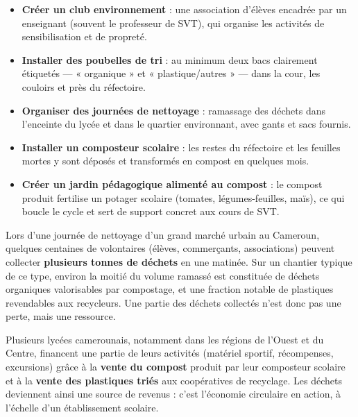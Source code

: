 \documentclass[11pt]{article}
\newcommand{\cle}[1]{{\popxbold\color{popdark}#1}}
\newcounter{popsec}
\newcounter{popsub}
\newcommand{\courssub}[1]{%
  \stepcounter{popsub}%
  \par\vspace{9pt}\noindent{\popxbold\fontsize{11.5}{13}\selectfont\color{popink}{\color{poporange}\thepopsec.\thepopsub}\hspace{6pt}#1}\par\nopagebreak\vspace{4pt}
}
\begin{document}
\begin{itemize}
\item \textbf{Créer un club environnement} : une association d'élèves encadrée par un enseignant (souvent le professeur de SVT), qui organise les activités de sensibilisation et de propreté.
\item \textbf{Installer des poubelles de tri} : au minimum deux bacs clairement étiquetés — « organique » et « plastique/autres » — dans la cour, les couloirs et près du réfectoire.
\item \textbf{Organiser des journées de nettoyage} : ramassage des déchets dans l'enceinte du lycée et dans le quartier environnant, avec gants et sacs fournis.
\item \textbf{Installer un composteur scolaire} : les restes du réfectoire et les feuilles mortes y sont déposés et transformés en compost en quelques mois.
\item \textbf{Créer un jardin pédagogique alimenté au compost} : le compost produit fertilise un potager scolaire (tomates, légumes-feuilles, maïs), ce qui boucle le cycle et sert de support concret aux cours de SVT.
\end{itemize}

\begin{exemplebox}
Lors d'une journée de nettoyage d'un grand marché urbain au Cameroun, quelques centaines de volontaires (élèves, commerçants, associations) peuvent collecter \textbf{plusieurs tonnes de déchets} en une matinée. Sur un chantier typique de ce type, environ la moitié du volume ramassé est constituée de déchets organiques valorisables par compostage, et une fraction notable de plastiques revendables aux recycleurs. Une partie des déchets collectés n'est donc pas une perte, mais une \cle{ressource}.
\end{exemplebox}

\begin{savaistu}
Plusieurs lycées camerounais, notamment dans les régions de l'Ouest et du Centre, financent une partie de leurs activités (matériel sportif, récompenses, excursions) grâce à la \textbf{vente du compost} produit par leur composteur scolaire et à la \textbf{vente des plastiques triés} aux coopératives de recyclage. Les déchets deviennent ainsi une source de revenus : c'est l'économie circulaire en action, à l'échelle d'un établissement scolaire.
\end{savaistu}

\courssub{Agir à l'échelle de la communauté}
\end{document}
